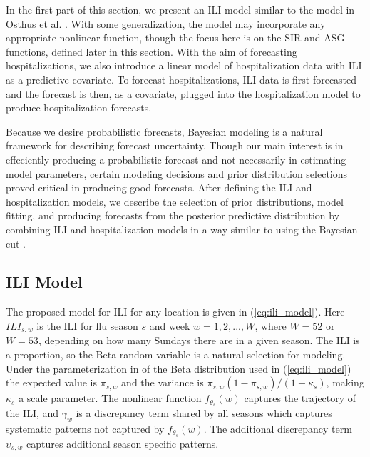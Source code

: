 In the first part of this section, we present an ILI model 
similar to the model in Osthus et al. \cite[]{osthus2019dynamic}. With some 
generalization, the model may incorporate any appropriate nonlinear function, 
though the focus here is on the SIR and ASG functions, defined later
in this section. 
With the aim of forecasting hospitalizations, we also introduce a linear 
model of hospitalization data with ILI as a predictive covariate. To forecast 
hospitalizations, ILI data is first forecasted and the forecast is then,
as a covariate,
plugged into the hospitalization model to produce
hospitalization forecasts.

Because we desire probabilistic forecasts, Bayesian modeling is a 
natural framework for describing forecast uncertainty. 
Though our main interest is in effeciently producing a probabilistic 
forecast and not 
necessarily in estimating model parameters, certain modeling decisions and 
prior distribution selections proved critical in producing good 
forecasts. After defining the ILI and hospitalization models, 
we describe the 
selection of prior distributions, model fitting, and producing forecasts
from the posterior predictive distribution by combining ILI and hospitalization
models in a way similar to using the 
Bayesian cut \cite[]{plummer2015cuts}.



\subsection{ILI Model} \label{sec:ili_model}

The proposed model for ILI for any location is given in (\ref{eq:ili_model}). 
Here $ILI_{s,w}$ is the ILI for flu season $s$ and week $w = 1, 2, ..., W$, 
where $W = 52$ or $W = 53$, depending on how many Sundays there are in a given 
season. The ILI is a proportion, so the Beta random variable is a natural 
selection for modeling. Under the parameterization in of the Beta distribution 
used in (\ref{eq:ili_model}) the expected value is $\pi_{s,w}$ and the 
variance is $\pi_{s,w}(1 - \pi_{s,w})/(1 + \kappa_s)$, making $\kappa_s$ a 
scale parameter. The nonlinear function $f_{\theta_s}(w)$ captures the 
trajectory of the ILI, and $\gamma_w$ is a discrepancy term shared by 
all seasons which captures 
systematic patterns not captured by $f_{\theta_s}(w)$. The additional 
discrepancy term $\upsilon_{s,w}$ captures additional season 
specific patterns.

